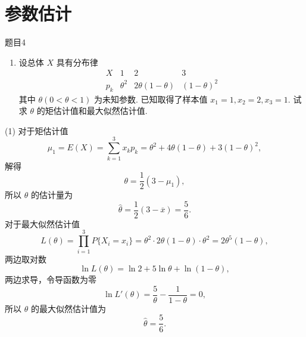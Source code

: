 \section{参数估计}

\begin{question}{题目4}
    \begin{enumerate}
        \item [(1)] 设总体 $X$ 具有分布律
              $$
                  \begin{array}{c|ccc}
                      X   & 1        & 2                 & 3            \\
                      \hline
                      p_k & \theta^2 & 2\theta(1-\theta) & (1-\theta)^2
                  \end{array}
              $$
              其中 $\theta(0 < \theta < 1)$ 为未知参数. 已知取得了样本值 $x_1 = 1, x_2 = 2, x_3 = 1$. 试求 $\theta$ 的矩估计值和最大似然估计值.
    \end{enumerate}
\end{question}
\begin{solution}
    (1) 对于矩估计值
    $$
        \mu_1 = E(X) = \sum_{k=1}^{3} x_kp_k = \theta^2+4\theta(1-\theta)+3(1-\theta)^2,
    $$
    解得
    $$
        \theta = \frac{1}{2}(3-\mu_1),
    $$
    所以 $\theta$ 的估计量为
    $$
        \hat{\theta} = \frac{1}{2}(3-\overline{x}) = \frac{5}{6}.
    $$
    对于最大似然估计值
    $$
        L(\theta) = \prod_{i=1}^{3} P\{X_i = x_i\}
        = \theta^2 \cdot 2\theta(1-\theta) \cdot \theta^2
        = 2\theta^5(1-\theta),
    $$
    两边取对数
    $$
        \ln L(\theta) = \ln2 + 5\ln\theta + \ln(1-\theta),
    $$
    两边求导，令导函数为零
    $$
        \ln L'(\theta) = \frac{5}{\theta} - \frac{1}{1-\theta} = 0,
    $$
    所以 $\theta$ 的最大似然估计值为
    $$
        \hat{\theta} = \frac{5}{6}.
    $$
\end{solution}



